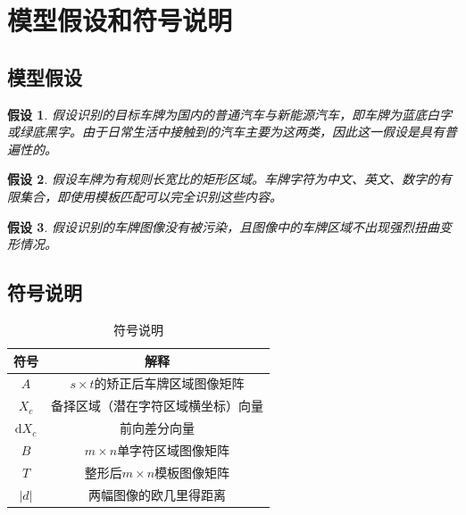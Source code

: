 \documentclass[utf8,a4paper]{ctexart}
\newtheorem{ass}{假设}
\begin{document}
\section{模型假设和符号说明}
\subsection{模型假设}
\begin{ass}
    假设识别的目标车牌为国内的普通汽车与新能源汽车，即车牌为蓝底白字或绿底黑字。由于日常生活中接触到的汽车主要为这两类，因此这一假设是具有普遍性的。
\end{ass}

\begin{ass}
    假设车牌为有规则长宽比的矩形区域。车牌字符为中文、英文、数字的有限集合，即使用模板匹配可以完全识别这些内容。
\end{ass}

\begin{ass}
    假设识别的车牌图像没有被污染，且图像中的车牌区域不出现强烈扭曲变形情况。
\end{ass}

\subsection{符号说明}

\begin{table}[H]
    \centering
    \caption{符号说明}
    \begin{tabular}{cc}
        \hline
        符号           & 解释                          \\
        \hline
        $A$            & $s\times t$的矫正后车牌区域图像矩阵                        \\
        $X_c$   & 备择区域（潜在字符区域横坐标）向量                                                 \\
        ${\mathrm d} X_c$ & 前向差分向量                                                 \\
        $B$ & $m \times n$单字符区域图像矩阵                                                 \\
        $T$ & 整形后$m\times n$模板图像矩阵                                                \\
        $|d|$ & 两幅图像的欧几里得距离                                                 \\
        \hline
    \end{tabular}
    \label{tab:my_label}
\end{table}
\end{document}
